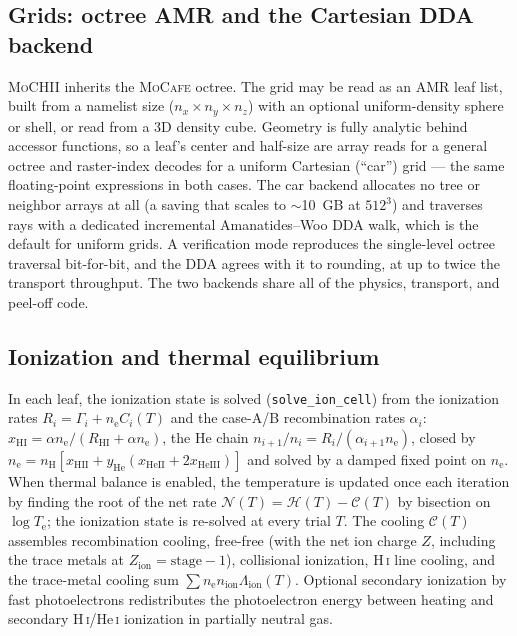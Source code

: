 \documentclass[twocolumn,linenumbers]{aastex702}
\newcommand{\code}[1]{\texttt{#1}}
\newcommand{\MoCHII}{\textsc{MoCHII}}
\newcommand{\MoCafe}{\textsc{MoCafe}}
\newcommand{\HI}{H\,\textsc{i}}
\newcommand{\HeI}{He\,\textsc{i}}
\newcommand{\Te}{T_{\mathrm{e}}}
\newcommand{\nelec}{n_{\mathrm{e}}}
\newcommand{\nH}{n_{\mathrm{H}}}
\newcommand{\xHI}{x_{\mathrm{HI}}}
\begin{document}
\subsection{Grids: octree AMR and the Cartesian DDA backend}
\label{sec:grids}

\MoCHII{} inherits the \MoCafe{} octree.  The grid may be read as an AMR
leaf list, built from a namelist size ($n_x\times n_y\times n_z$) with an
optional uniform-density sphere or shell, or read from a 3D density cube.
Geometry is fully analytic behind accessor functions, so a leaf's center
and half-size are array reads for a general octree and raster-index decodes
for a uniform Cartesian (``car'') grid --- the same floating-point
expressions in both cases.  The car backend allocates no tree or neighbor
arrays at all (a saving that scales to $\sim$10~GB at $512^3$) and
traverses rays with a dedicated incremental Amanatides--Woo DDA walk, which
is the default for uniform grids.  A verification mode reproduces the
single-level octree traversal bit-for-bit, and the DDA agrees with it to
rounding, at up to twice the transport throughput.  The two backends share
all of the physics, transport, and peel-off code.

\subsection{Ionization and thermal equilibrium}
\label{sec:equil}

In each leaf, the ionization state is solved (\code{solve\_ion\_cell}) from the
ionization rates $R_i = \Gamma_i + \nelec C_i(T)$ and the case-A/B
recombination rates $\alpha_i$: $\xHI = \alpha\nelec/(R_{\mathrm{HI}} +
\alpha\nelec)$, the He chain $n_{i+1}/n_i = R_i/(\alpha_{i+1}\nelec)$, closed
by $\nelec = \nH[x_{\mathrm{HII}} + y_{\mathrm{He}}(x_{\mathrm{HeII}} +
2x_{\mathrm{HeIII}})]$ and solved by a damped fixed point on $\nelec$.  When
thermal balance is enabled, the temperature is updated once each iteration
by finding the root of the net rate $\mathcal{N}(T) = \mathcal{H}(T) -
\mathcal{C}(T)$ by bisection on $\log \Te$; the ionization state is
re-solved at every trial $T$.  The cooling $\mathcal{C}(T)$ assembles
recombination cooling, free-free (with the net ion charge $Z$, including
the trace metals at $Z_{\mathrm{ion}} = \mathrm{stage}-1$), collisional
ionization, \HI{} line cooling, and the trace-metal cooling sum
$\sum \nelec n_{\mathrm{ion}}\Lambda_{\mathrm{ion}}(T)$.  Optional secondary
ionization by fast photoelectrons \citep{shull1985} redistributes the
photoelectron energy between heating and secondary \HI/\HeI{} ionization
in partially neutral gas.
\end{document}
